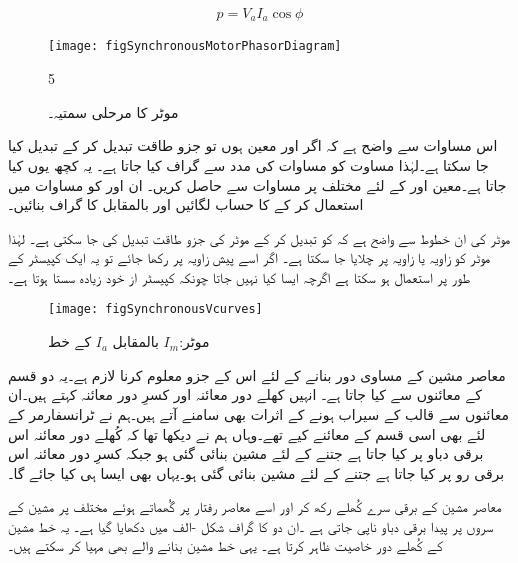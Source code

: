 \begin{align}\label{مساوات_معاصر_طاقت_برابر_دباو_رو_جزو_طاقت}
p=V_a I_a \cos \phi
\end{align}
%
\begin{figure}
\centering
\texttt{[image: figSynchronousMotorPhasorDiagram]}
\caption{موٹر کا مرحلی سمتیہ۔}
\label{شکل_معاصر_موٹر_کی_دوری_سمتیہ}
5\end{figure}
%
اس مساوات سے واضح ہے کہ اگر  اور  معین ہوں تو جزو طاقت تبدیل کر کے  تبدیل کیا جا سکتا ہے۔لہٰذا مساوت   کو مساوات   کی مدد سے گراف کیا جاتا ہے۔ یہ کچھ یوں کیا جاتا ہے۔معین  اور  کے لئے مختلف  پر مساوات    سے  حاصل کریں۔ ان  اور  کو مساوات   میں استعمال کر کے  کا حساب لگائیں اور  بالمقابل  کا گراف بنائیں۔

موٹر کی ان خطوط سے واضح ہے کہ  کو تبدیل کر کے موٹر کی جزو طاقت تبدیل کی جا سکتی ہے۔ لہٰذا موٹر کو  زاویہ یا  زاویہ  پر چلایا جا سکتا ہے۔ اگر اسے پیش زاویہ پر رکھا جائے تو یہ ایک کپیسٹر  کے طور پر استعمال ہو سکتا ہے اگرچہ ایسا کیا نہیں جاتا چونکہ کپیسٹر از خود  زیادہ سستا ہوتا ہے۔ 
\begin{figure}
\centering
\texttt{[image: figSynchronousVcurves]}
\caption{موٹر:$I_{m}$ بالمقابل $I_a$ کے خط}
\label{شکل_معاصر_برقی_رو_بالمقابل_برقی_دباو}
\end{figure}
معاصر مشین کے مساوی دور بنانے کے لئے اس کے جزو معلوم کرنا لازم ہے۔یہ دو قسم کے معائنوں سے کیا جاتا ہے۔ انہیں کھلے دور معائنہ اور کسرِ دور معائنہ کہتے ہیں۔ان معائنوں سے قالب کے سیراب ہونے کے اثرات بھی سامنے آتے ہیں۔ہم نے ٹرانسفارمر کے لئے بھی اسی قسم کے معائنے کیے تھے۔وہاں ہم نے دیکھا تھا کہ کُھلے دور معائنہ اس برقی دباو پر کیا جاتا ہے جتنے کے لئے مشین بنائی گئی ہو جبکہ کسرِ دور معائنہ اس برقی رو پر کیا جاتا ہے جتنے کے لئے مشین بنائی گئی ہو۔یہاں بھی ایسا ہی کیا جائے گا۔ 

معاصر مشین کے برقی سرے کُھلے رکھ کر اور اسے معاصر رفتار پر گُھماتے ہوئے مختلف  پر  مشین کے سروں پر پیدا برقی دباو  ناپی جاتی ہے ۔ان دو کا گراف شکل -الف میں دکھایا گیا ہے۔ یہ خط مشین کے کُھلے دور خاصیت ظاہر کرتا ہے۔ یہی خط مشین بنانے والے بھی مہیا کر سکتے ہیں۔

